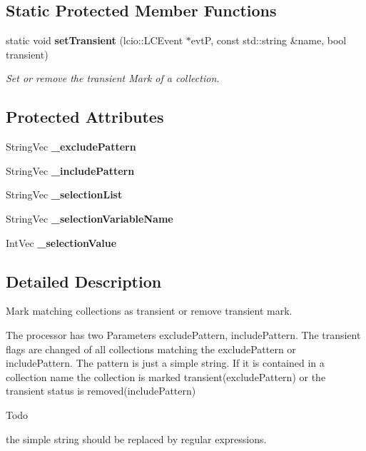 \subsection*{Static Protected Member Functions}
\begin{DoxyCompactItemize}
\item 
static void {\bf set\-Transient} (lcio\-::\-L\-C\-Event $\ast$evt\-P, const std\-::string \&name, bool transient)
\begin{DoxyCompactList}\small\item\em Set or remove the transient Mark of a collection. \end{DoxyCompactList}\end{DoxyCompactItemize}
\subsection*{Protected Attributes}
\begin{DoxyCompactItemize}
\item 
String\-Vec {\bfseries \-\_\-exclude\-Pattern}\label{classCALICE_1_1CollectionSelector_a86b479c6f8e185649ad9abd60f7368f6}

\item 
String\-Vec {\bfseries \-\_\-include\-Pattern}\label{classCALICE_1_1CollectionSelector_affaaa3265a0d7999c529145d548b4acb}

\item 
String\-Vec {\bfseries \-\_\-selection\-List}\label{classCALICE_1_1CollectionSelector_a256b9ed4988d50f352080713f747eb48}

\item 
String\-Vec {\bfseries \-\_\-selection\-Variable\-Name}\label{classCALICE_1_1CollectionSelector_a312bf14ff28957ec68c3155065a7aae4}

\item 
Int\-Vec {\bfseries \-\_\-selection\-Value}\label{classCALICE_1_1CollectionSelector_a924046461ef2a59eebafcc04184f6069}

\end{DoxyCompactItemize}


\subsection{Detailed Description}
Mark matching collections as transient or remove transient mark. 

The processor has two Parameters exclude\-Pattern, include\-Pattern. The transient flags are changed of all collections matching the exclude\-Pattern or include\-Pattern. The pattern is just a simple string. If it is contained in a collection name the collection is marked transient(exclude\-Pattern) or the transient status is removed(include\-Pattern) \begin{DoxyRefDesc}{Todo}
\item[{\bf Todo}]the simple string should be replaced by regular expressions. \end{DoxyRefDesc}


